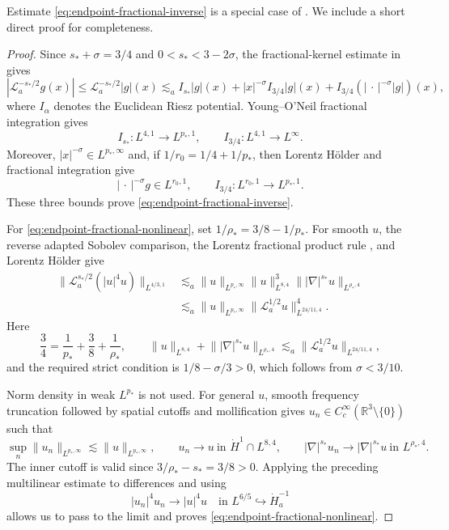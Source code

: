 \documentclass[preprint,12pt]{elsarticle}
\numberwithin{equation}{section}
\theoremstyle{definition}
\theoremstyle{remark}
\newcommand{\R}{\mathbb R}
\newcommand{\cL}{\mathcal L}
\newcommand{\Ham}{\dot H_a^{-1}}
\newcommand{\norm}[2]{\lVert #1\rVert_{#2}}
\begin{document}
Estimate \eqref{eq:endpoint-fractional-inverse} is a special case of 
\cite[Theorem~2.3]{LiuYuZhou}. We include a short direct proof for
completeness.


\begin{proof}
Since $s_*+\sigma=3/4$ and
$0<s_*<3-2\sigma$, the fractional-kernel estimate in
\cite[Lemma~2.2 and Eq.~(2.1)]{KillipSobolev} gives
\[
|\cL_a^{-s_*/2}g(x)|
\leq\cL_a^{-s_*/2}|g|(x)
\lesssim_a I_{s_*}|g|(x)
+|x|^{-\sigma}I_{3/4}|g|(x)
+I_{3/4}(|\,\cdot\,|^{-\sigma}|g|)(x),
\]
where $I_\alpha$ denotes the Euclidean Riesz potential. Young--O'Neil
fractional integration gives
\[
I_{s_*}:L^{4,1}\to L^{p_*,1},
\qquad I_{3/4}:L^{4,1}\to L^\infty.
\]
Moreover, $|x|^{-\sigma}\in L^{p_*,\infty}$ and, if
$1/r_0=1/4+1/p_*$, then Lorentz H\"older and fractional integration
give
\[
|\,\cdot\,|^{-\sigma}g\in L^{r_0,1},
\qquad I_{3/4}:L^{r_0,1}\to L^{p_*,1}.
\]
These three bounds prove \eqref{eq:endpoint-fractional-inverse}.
	
	For \eqref{eq:endpoint-fractional-nonlinear}, set
	$1/\rho_*=3/8-1/p_*$. For smooth $u$, the reverse adapted Sobolev
	comparison, the Lorentz fractional product rule
	\cite[Lemma~3.8 and Corollary~3.9]{AnKimRyu}, and Lorentz H\"older give
	\[
	\begin{aligned}
		\norm{\cL_a^{s_*/2}(|u|^4u)}{L^{4/3,1}}
		&\lesssim_a
		\norm{u}{L^{p_*,\infty}}\norm{u}{L^{8,4}}^3
		\norm{|\nabla|^{s_*}u}{L^{\rho_*,4}}\\
		&\lesssim_a
		\norm{u}{L^{p_*,\infty}}
		\norm{\cL_a^{1/2}u}{L^{24/11,4}}^4.
	\end{aligned}
	\]
	Here
	\[
	\frac34=\frac1{p_*}+\frac38+\frac1{\rho_*},
	\qquad
	\norm{u}{L^{8,4}}+
	\norm{|\nabla|^{s_*}u}{L^{\rho_*,4}}
	\lesssim_a\norm{\cL_a^{1/2}u}{L^{24/11,4}},
	\]
	and the required strict condition is
	$1/8-\sigma/3>0$, which follows from $\sigma<3/10$.
	
    Norm density in weak $L^{p_*}$ is not used.	For general $u$, 
smooth frequency truncation followed by spatial cutoffs and
	mollification gives $u_n\in C_c^\infty(\R^3\setminus\{0\})$ such that
	\[
	\sup_n\norm{u_n}{L^{p_*,\infty}}
	\lesssim\norm{u}{L^{p_*,\infty}},\qquad
	u_n\to u\ \text{in }\dot H^1\cap L^{8,4},\qquad
	|\nabla|^{s_*}u_n\to|\nabla|^{s_*}u
	\ \text{in }L^{\rho_*,4}.
	\]
	The inner cutoff is valid since $3/\rho_*-s_*=3/8>0$.
	Applying the preceding multilinear estimate to differences and using
	\[
	|u_n|^4u_n\to|u|^4u
	\quad\text{in }L^{6/5}\hookrightarrow\Ham
	\]
	allows us to pass to the limit and proves
	\eqref{eq:endpoint-fractional-nonlinear}.
\end{proof}
\end{document}
